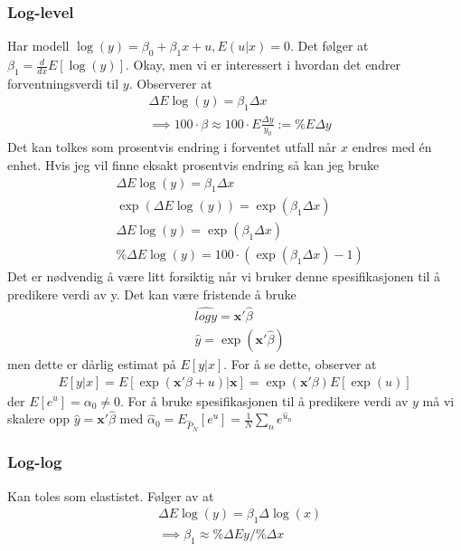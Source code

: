\subsubsection{Log-level}
Har modell $\log(y)=\beta_0+\beta_1x +u,  E(u|x)=0$. Det følger at $\beta_1 = \frac{d}{dx}E[\log(y)]$. Okay, men vi er interessert i hvordan det endrer forventningsverdi til $y$. Observerer at 
\begin{align}
&\Delta E \log(y)  =  \beta_1 \Delta x \\
&\implies 100\cdot\beta \approx 100\cdot E\frac{\Delta y}{y_0} := \%E \Delta y
\end{align}
Det kan tolkes som prosentvis endring i forventet utfall når $x$ endres med én enhet. Hvis jeg vil finne eksakt prosentvis endring så kan jeg bruke
\begin{align}
&\Delta E \log(y) = \beta_1 \Delta x \\
&\exp(\Delta E \log(y)) = \exp(\beta_1 \Delta x) \\
&\Delta E \log(y) = \exp(\beta_1 \Delta x) \\
&\% \Delta E \log(y) = 100\cdot(\exp(\beta_1 \Delta x) -1)
\end{align}
Det er nødvendig å være litt forsiktig når vi bruker denne spesifikasjonen til å predikere verdi av y. Det kan være fristende å bruke
\begin{align}
&\widehat{logy} = \mathbf{x}'\hat{\beta} \\
&\hat{y} = \exp(\mathbf{x}'\hat{\beta})
\end{align} 
men dette er dårlig estimat på $E[y|x]$. For å se dette, observer at
\begin{align}
E[y|x]=E[\exp(\mathbf{x}'\beta+u)|\mathbf{x}]=\exp(\mathbf{x}'\beta)E[\exp(u)]
\end{align}
der $E[e^u] =\alpha_0 \neq 0$. For å bruke spesifikasjonen til å predikere verdi av $y$ må vi skalere opp $\hat{y}=\mathbf{x}'\hat{\beta}$ med $\hat{\alpha}_0 = E_{\hat{P}_N}[e^u] = \frac{1}{N}\sum_n e^{\hat{u}_n}$
\subsubsection{Log-log}
Kan toles som elastistet. Følger av at
\begin{align}
&\Delta E \log(y) = \beta_1 \Delta \log(x) \\
&\implies \beta_1 \approx \%\Delta E y / \%\Delta x
\end{align}
